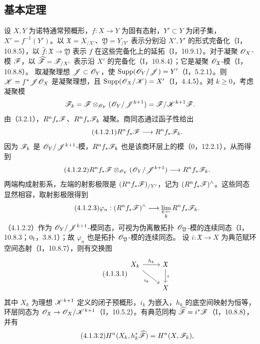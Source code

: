 \subsection{基本定理}
设 $X,Y$ 为诺特通常预概形，$f:X\to Y$ 为固有态射，$Y'\subset Y$ 为闭子集，$X'=f^{-1}(Y')$。以 $\mathfrak X=X_{/X'}$、$\mathfrak Y=Y_{/Y'}$ 表示分别沿 $X',Y'$ 的形式完备化（I，10.8.5），以 $\widehat f:\mathfrak X\to\mathfrak Y$ 表示 $f$ 在这些完备化上的延拓（I，10.9.1）。对于凝聚 $\mathscr O_X$-模 $\mathscr F$，以 $\widehat{\mathscr F}=\mathscr F_{/X'}$ 表示沿 $X'$ 的完备化（I，10.8.4）；它是凝聚 $\mathscr O_{\mathfrak X}$-模（I，10.8.8）。
取凝聚理想 $\mathscr J\subset\mathscr O_Y$，使 $\operatorname{Supp}(\mathscr O_Y/\mathscr J)=Y'$（I，5.2.1）。则 $\mathscr K=f^*\mathscr J\mathscr O_X$ 是凝聚理想，且 $\operatorname{Supp}(\mathscr O_X/\mathscr K)=X'$（I，4.4.5）。对 $k\ge0$，考虑凝聚模
\[
\mathscr F_k=\mathscr F\otimes_{\mathscr O_Y}(\mathscr O_Y/\mathscr J^{k+1})=\mathscr F/\mathscr K^{k+1}\mathscr F.
\]
由（3.2.1），$R^nf_*\mathscr F$、$R^nf_*\mathscr F_k$ 凝聚。商同态通过函子性给出
\begin{equation}\tag{4.1.2.1}R^nf_*\mathscr F\longrightarrow R^nf_*\mathscr F_k.\end{equation}
因为 $\mathscr F_k$ 是 $\mathscr O_Y/\mathscr J^{k+1}$-模，$R^nf_*\mathscr F_k$ 也是该商环层上的模（0，12.2.1），从而得到
\begin{equation}\tag{4.1.2.2}
R^nf_*\mathscr F\otimes_{\mathscr O_Y}(\mathscr O_Y/\mathscr J^{k+1})\longrightarrow R^nf_*\mathscr F_k.
\end{equation}
两端构成射影系，左端的射影极限是 $(R^nf_*\mathscr F)_{/Y'}$，记为 $(R^nf_*\mathscr F)^\wedge$。这些同态显然相容，取射影极限得到
\begin{equation}\tag{4.1.2.3}
\varphi_n:(R^nf_*\mathscr F)^\wedge\longrightarrow\varprojlim_kR^nf_*\mathscr F_k.
\end{equation}
（4.1.2.2）作为 $\mathscr O_Y/\mathscr J^{k+1}$-模同态，可视为伪离散拓扑 $\mathscr O_{\mathfrak Y}$-模的连续同态（I，10.8.3；$0_{\mathrm I}$，3.8.1）；故 $\varphi_n$ 也是拓扑 $\mathscr O_{\mathfrak Y}$-模的连续同态。
设 $i:\mathfrak X\to X$ 为典范赋环空间态射（I，10.8.7），则有交换图
\begin{equation}\tag{4.1.3.1}
\begin{tikzcd}
X_k\arrow[r,"h_k"]\arrow[dr,"i_k"']&\mathfrak X\arrow[d,"i"]\\
&X
\end{tikzcd}
\end{equation}
其中 $X_k$ 为理想 $\mathscr K^{k+1}$ 定义的闭子预概形，$i_k$ 为嵌入，$h_k$ 的底空间映射为恒等，环层同态为 $\mathscr O_{\mathfrak X}\to\mathscr O_X/\mathscr K^{k+1}$（I，10.5.2）。有典范同构 $\widehat{\mathscr F}=i^*\mathscr F$（I，10.8.8），并有
\begin{equation}\tag{4.1.3.2}H^n(X_k,h_k^*\widehat{\mathscr F})=H^n(X,\mathscr F_k),\end{equation}
